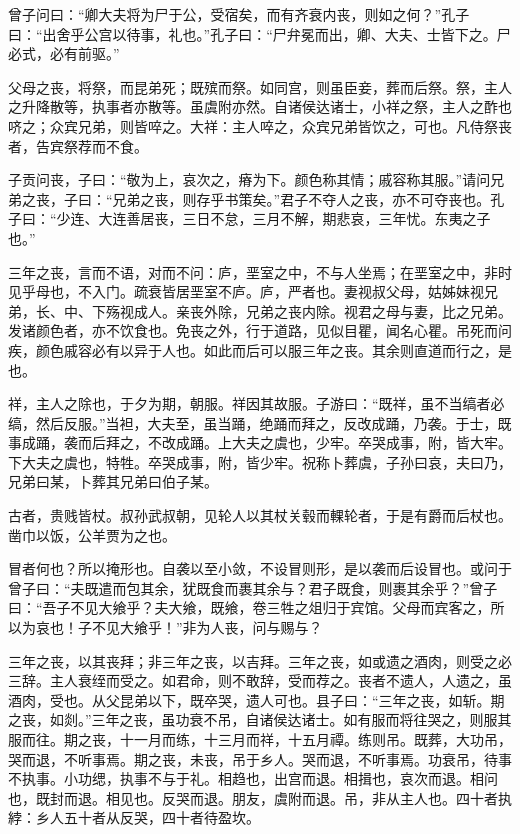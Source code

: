 \documentclass[]{article}
\begin{document}
曾子问曰：``卿大夫将为尸于公，受宿矣，而有齐衰内丧，则如之何？''孔子曰：``出舍乎公宫以待事，礼也。''孔子曰：``尸弁冕而出，卿、大夫、士皆下之。尸必式，必有前驱。''

父母之丧，将祭，而昆弟死；既殡而祭。如同宫，则虽臣妾，葬而后祭。祭，主人之升降散等，执事者亦散等。虽虞附亦然。自诸侯达诸士，小祥之祭，主人之酢也哜之；众宾兄弟，则皆啐之。大祥：主人啐之，众宾兄弟皆饮之，可也。凡侍祭丧者，告宾祭荐而不食。

子贡问丧，子曰：``敬为上，哀次之，瘠为下。颜色称其情；戚容称其服。''请问兄弟之丧，子曰：``兄弟之丧，则存乎书策矣。''君子不夺人之丧，亦不可夺丧也。孔子曰：``少连、大连善居丧，三日不怠，三月不解，期悲哀，三年忧。东夷之子也。''

三年之丧，言而不语，对而不问：庐，垩室之中，不与人坐焉；在垩室之中，非时见乎母也，不入门。疏衰皆居垩室不庐。庐，严者也。妻视叔父母，姑姊妹视兄弟，长、中、下殇视成人。亲丧外除，兄弟之丧内除。视君之母与妻，比之兄弟。发诸颜色者，亦不饮食也。免丧之外，行于道路，见似目瞿，闻名心瞿。吊死而问疾，颜色戚容必有以异于人也。如此而后可以服三年之丧。其余则直道而行之，是也。

祥，主人之除也，于夕为期，朝服。祥因其故服。子游曰：``既祥，虽不当缟者必缟，然后反服。''当袒，大夫至，虽当踊，绝踊而拜之，反改成踊，乃袭。于士，既事成踊，袭而后拜之，不改成踊。上大夫之虞也，少牢。卒哭成事，附，皆大牢。下大夫之虞也，特牲。卒哭成事，附，皆少牢。祝称卜葬虞，子孙曰哀，夫曰乃，兄弟曰某，卜葬其兄弟曰伯子某。

古者，贵贱皆杖。叔孙武叔朝，见轮人以其杖关毂而輠轮者，于是有爵而后杖也。凿巾以饭，公羊贾为之也。

冒者何也？所以掩形也。自袭以至小敛，不设冒则形，是以袭而后设冒也。或问于曾子曰：``夫既遣而包其余，犹既食而裹其余与？君子既食，则裹其余乎？''曾子曰：``吾子不见大飨乎？夫大飨，既飨，卷三牲之俎归于宾馆。父母而宾客之，所以为哀也！子不见大飨乎！''非为人丧，问与赐与？

三年之丧，以其丧拜；非三年之丧，以吉拜。三年之丧，如或遗之酒肉，则受之必三辞。主人衰绖而受之。如君命，则不敢辞，受而荐之。丧者不遗人，人遗之，虽酒肉，受也。从父昆弟以下，既卒哭，遗人可也。县子曰：``三年之丧，如斩。期之丧，如剡。''三年之丧，虽功衰不吊，自诸侯达诸士。如有服而将往哭之，则服其服而往。期之丧，十一月而练，十三月而祥，十五月禫。练则吊。既葬，大功吊，哭而退，不听事焉。期之丧，未丧，吊于乡人。哭而退，不听事焉。功衰吊，待事不执事。小功缌，执事不与于礼。相趋也，出宫而退。相揖也，哀次而退。相问也，既封而退。相见也。反哭而退。朋友，虞附而退。吊，非从主人也。四十者执綍：乡人五十者从反哭，四十者待盈坎。
\end{document}

